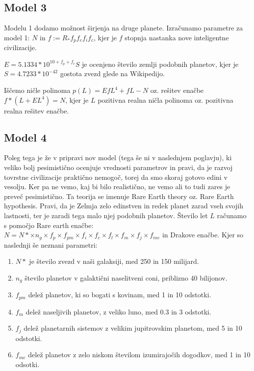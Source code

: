 \documentclass[a4paper]{IEEEtran}
\begin{document}
\subsection{Model 3}

Modelu 1 dodamo možnost širjenja na druge planete. Izračunamo parametre za model 1:
$N$ in $f := R_\ast f_p f_e f_i f_c$, kjer je $f$ stopnja nastanka nove inteligentne civilizacije.

$E = 5.1334 * 10^{10 + f_p + f_e} S$ je ocenjeno število zemlji podobnih planetov, kjer je $S = 4.7233 * 10^{-42}$ gostota zvezd glede na Wikipedijo.

Iščemo ničle polinoma $p(L) = E f L^4 + f L - N$ oz. rešitev enačbe $f * (L + E L^4) = N$, kjer je $L$ pozitivna realna ničla polinoma oz. pozitivna realna rešitev enačbe.

\subsection{Model 4}

Poleg tega je že v pripravi nov model (tega še ni v naslednjem poglavju), ki veliko bolj pesimistično ocenjuje vrednosti parametrov in pravi, da je razvoj tovrstne civilizacije praktično nemogoč, torej da smo skoraj gotovo edini v vesolju. Ker pa ne vemo, kaj bi bilo realistično, ne vemo ali to tudi zares je preveč pesimistično. Ta teorija se imenuje Rare Earth theory oz. Rare Earth hypothesis. Pravi, da je Zelmja zelo edinstven in redek planet zarad vseh svojih lastnosti, ter je zaradi tega malo njej podobnih planetov. Število let $L$ računamo s pomočjo Rare earth enačbe: $N = N*\times n_g \times f_p \times f_{pm} \times f_i \times f_c \times f_l \times f_m \times f_j \times f_{me}$  in Drakove enačbe. Kjer so naslednji še neznani parametri:

\begin{enumerate}
	\item $N*$ je število zvezd v naši galaksiji, med 250 in 150 milijard.
	\item $n_g$ število planetov v galaktični naselitveni coni, priblizno 40 bilijonov.
	\item $f_{pm}$ delež planetov, ki so bogati s kovinam, med 1 in 10 odstotki.
	\item $f_m$ delež naseljivih planetov, z veliko luno, med 0.3 in 3 odstotki.
	\item $f_j$ delež planetarnih sistemov z velikim jupitrovskim planetom, med 5 in 10 odstotki.
	\item $f_{me}$ delež planetov z zelo niskom številom izumirajočih dogodkov, med 1 in 10 odsotki.
\end{enumerate}
\end{document}
